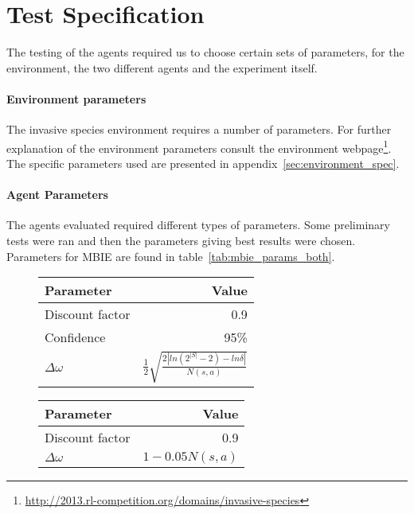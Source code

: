 \section{Test Specification}
\label{sec:test_spec}

The testing of the agents required us to choose certain sets of parameters, for
the environment, the two different agents and the experiment itself. 

\paragraph{Environment parameters}

The invasive species environment requires a number of parameters. For further
explanation of the environment parameters consult the environment
webpage\footnote{\url{http://2013.rl-competition.org/domains/invasive-species}}.
The specific parameters used are presented in
appendix~\ref{sec:environment_spec}.

\paragraph{Agent Parameters}

The agents evaluated required different types of parameters. Some preliminary
tests were ran and then the parameters giving best results were chosen.
Parameters for MBIE are found in table~\ref{tab:mbie_params_both}.

\begin{table}[H]
\centering
{}
\label{tab:mbie_params_both}

\begin{subfigure}[b]{0.47\textwidth}
    \centering
    \label{tab:mbie_params} 
    \begin{tabular}{lr}
     \toprule
     Parameter & Value \\
     \midrule
     Discount factor & 0.9 \\
     Confidence & 95\% \\
     $\Delta \omega$ & $\frac{1}{2}\sqrt{\frac{2|ln(2^{|S|}-2) - ln  \delta |}{N(s,a)}}$ \\
     
     \bottomrule
    \end{tabular}
\end{subfigure}
\quad
\begin{subfigure}[b]{0.47\textwidth}
    \centering
    \label{tab:mbie_realistic_params}
    \begin{tabular}{lr}
     \toprule
     Parameter & Value \\
     \midrule
     Discount factor & 0.9 \\
     $\Delta \omega$ & $1 - 0.05 N(s,a)$ \\
     \bottomrule
    \end{tabular}
\end{subfigure}
\end{table}

